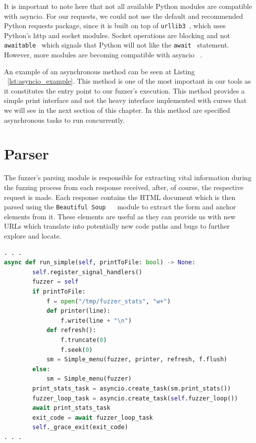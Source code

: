 It is important to note here that not all available Python modules are compatible with asyncio. For our requests, we could not use the default and recommended Python requests package, since it is built on top of {\tt urllib3 }, which uses Python's http and socket modules. Socket operations are blocking and not  {\tt awaitable } which signals that Python will not like the {\tt await } statement. However, more modules are becoming compatible with asyncio ~\cite{aiohttp}.

An example of an asynchronous method can be seen at Listing ~\ref{lst:asyncio_example}. This method is one of the most important in our tools as it constitutes the entry point to our fuzzer's execution. This method provides a simple print interface and not the heavy interface implemented with curses that we will see in the next section of this chapter. In this method are specified asynchronous tasks to run concurrently.

\section{Parser}
The fuzzer's parsing module is responsible for extracting vital information during the fuzzing process from each response received, after, of course, the respective request is made. Each response contains the HTML document which is then parsed using the {\tt  Beautiful Soup } ~\cite{beautiful_soup} module to extract the form and anchor elements from it. These elements are useful as they can provide us with new URLs which translate into potentially new code paths and bugs to further explore and locate. 

\begin{lstlisting}[aboveskip=\baselineskip, showstringspaces=false, frame=single, language=Python, columns=flexible, keepspaces=true, caption={\textit{Starting point for the fuzzer's execution using a simple print interface}}, numberstyle=\color{gray}, numbersep=5pt, label={lst:asyncio_example}]
. . . 
async def run_simple(self, printToFile: bool) -> None:
        self.register_signal_handlers()
        fuzzer = self
        if printToFile:
            f = open("/tmp/fuzzer_stats", "w+")
            def printer(line):
                f.write(line + "\n")
            def refresh():
                f.truncate(0)
                f.seek(0)
            sm = Simple_menu(fuzzer, printer, refresh, f.flush)
        else:   
            sm = Simple_menu(fuzzer)
        print_stats_task = asyncio.create_task(sm.print_stats())
        fuzzer_loop_task = asyncio.create_task(self.fuzzer_loop())
        await print_stats_task
        exit_code = await fuzzer_loop_task
        self._grace_exit(exit_code)
. . .
     
\end{lstlisting}

